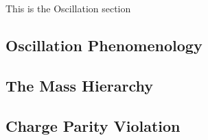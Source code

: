 This is the Oscillation section
\subsection{Oscillation Phenomenology}
\subsection{The Mass Hierarchy}
\subsection{Charge Parity Violation}